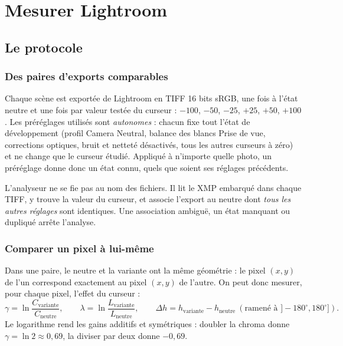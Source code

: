 \chapter{Mesurer Lightroom}

\section{Le protocole}
\subsection{Des paires d'exports comparables}
Chaque scène est exportée de Lightroom en TIFF 16 bits sRGB, une fois à l'état
neutre et une fois par valeur testée du curseur : $-100$, $-50$, $-25$, $+25$,
$+50$, $+100$. Les préréglages utilisés sont \emph{autonomes} : chacun fixe
tout l'état de développement (profil Camera Neutral, balance des blancs Prise
de vue, corrections optiques, bruit et netteté désactivés, tous les autres
curseurs à zéro) et ne change que le curseur étudié. Appliqué à n'importe
quelle photo, un préréglage donne donc un état connu, quels que soient ses
réglages précédents.

L'analyseur ne se fie pas au nom des fichiers. Il lit le XMP embarqué dans
chaque TIFF, y trouve la valeur du curseur, et associe l'export au neutre dont
\emph{tous les autres réglages} sont identiques. Une association ambiguë, un
état manquant ou dupliqué arrête l'analyse.

\subsection{Comparer un pixel à lui-même}
Dans une paire, le neutre et la variante ont la même géométrie : le pixel
$(x,y)$ de l'un correspond exactement au pixel $(x,y)$ de l'autre. On peut
donc mesurer, pour chaque pixel, l'effet du curseur :
\begin{equation}
\gamma = \ln\frac{C_{\text{variante}}}{C_{\text{neutre}}},\qquad
\lambda = \ln\frac{L_{\text{variante}}}{L_{\text{neutre}}},\qquad
\Delta h = h_{\text{variante}}-h_{\text{neutre}}\ (\text{ramené à }]-180^\circ,180^\circ]).
\end{equation}
Le logarithme rend les gains additifs et symétriques : doubler la chroma donne
$\gamma=\ln 2\approx0{,}69$, la diviser par deux donne $-0{,}69$.

